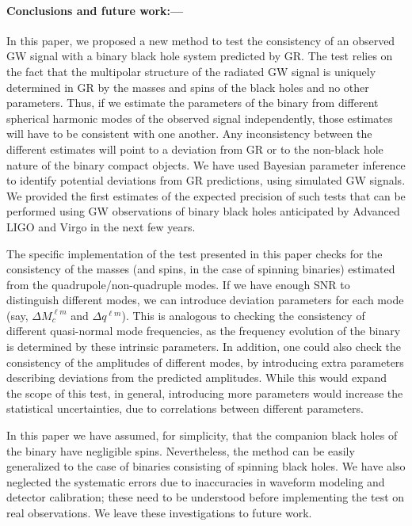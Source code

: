 \documentclass[prl,preprintnumbers,twocolumn,eqsecnum,floatfix,a4paper,nofootinbib,superscriptaddress]{revtex4}
\begin{document}
\paragraph{Conclusions and future work:---} In this paper, we proposed a new method to test the consistency of an observed GW signal with a binary black hole system predicted by GR. The test relies on the fact that the multipolar structure of the radiated GW signal is uniquely determined in GR by the masses and spins of the black holes and no other parameters. Thus, if we estimate the parameters of the binary from different spherical harmonic modes of the observed signal independently, those estimates will have to be consistent with one another. Any inconsistency between the different estimates will point to a deviation from GR or to the non-black hole nature of the binary compact objects. We have used Bayesian parameter inference to identify potential deviations from GR predictions, using simulated GW signals.  We provided the first estimates of the expected precision of such tests that can be performed using GW observations of binary black holes anticipated by Advanced LIGO and Virgo in the next few years. 

The specific implementation of the test presented in this paper checks for the consistency of the masses (and spins, in the case of spinning binaries) estimated from the quadrupole/non-quadruple modes. If we have enough SNR to distinguish different modes, we can introduce deviation parameters for each mode (say, $\Delta M_c^{\ell m}$ and $\Delta q^{\ell m}$). This is analogous to checking the consistency of different quasi-normal mode frequencies, as the frequency evolution of the binary is determined by these intrinsic parameters. In addition, one could also check the consistency of the amplitudes of different modes, by introducing extra parameters describing deviations from the predicted amplitudes. While this would expand the scope of this test, in general, introducing more parameters would increase the statistical uncertainties, due to correlations between different parameters. 

In this paper we have assumed, for simplicity, that the companion black holes of the binary have negligible spins. Nevertheless, the method can be easily generalized to the case of binaries consisting of spinning black holes. We have also neglected the systematic errors due to inaccuracies in waveform modeling and detector calibration; these need to be understood before implementing the test on real observations. We leave these investigations to future work. 
\end{document}
